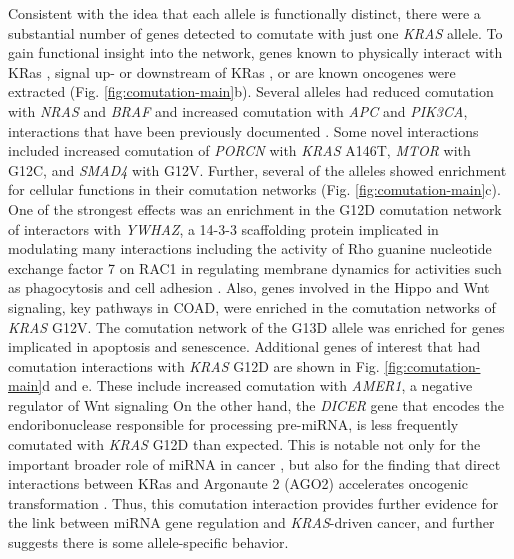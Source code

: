 \documentclass[english, 10pt, letterpaper]{article}
\newcommand{\KRAS}{\emph{KRAS}}
\newcommand{\kras}{KRas}
\begin{document}
Consistent with the idea that each allele is functionally distinct, there were a substantial number of genes detected to comutate with just one \KRAS{} allele.
To gain functional insight into the network, genes known to physically interact with \kras{} \cite{Kovalski2019}, signal up- or downstream of \kras{} \cite{Kanehisa2017, Kanehisa2016KEGGAnnotation.}, or are known oncogenes \cite{Bamford2004TheWebsite., Sondka2018} were extracted (Fig. \ref{fig:comutation-main}b).
Several alleles had reduced comutation with \emph{NRAS} and \emph{BRAF} and increased comutation with \emph{APC} and \emph{PIK3CA}, interactions that have been previously documented \cite{Sensi2006MutuallyMelanoma., Jauhri2017, Seth2009ConcomitantCancer., Cisowski2016, Janssen2006, Sakai2018, Kennedy2011, Wang2013, Green2015, Yeang2008CombinatorialCancer., CancerGenomeAtlasNetwork2012}. 
Some novel interactions included increased comutation of \emph{PORCN} with \KRAS{} A146T, \emph{MTOR} with G12C, and \emph{SMAD4} with G12V.
Further, several of the alleles showed enrichment for cellular functions in their comutation networks (Fig. \ref{fig:comutation-main}c).
One of the strongest effects was an enrichment in the G12D comutation network of interactors with \emph{YWHAZ}, a 14-3-3 scaffolding protein implicated in modulating many interactions including the activity of Rho guanine nucleotide exchange factor 7 on RAC1 in regulating membrane dynamics for activities such as phagocytosis and cell adhesion \cite{Angrand2006TransgenicSignaling.}.
Also, genes involved in the Hippo and Wnt signaling, key pathways in COAD, were enriched in the comutation networks of \KRAS{} G12V.
The comutation network of the G13D allele was enriched for genes implicated in apoptosis and senescence.
Additional genes of interest that had comutation interactions with \KRAS{} G12D are shown in Fig. \ref{fig:comutation-main}d and e.
These include increased comutation with \emph{AMER1}, a negative regulator of Wnt signaling \cite{Grohmann2007AMER1Membrane., Tanneberger2011StructuralAmer1.}
On the other hand, the \emph{DICER} gene that encodes the endoribonuclease responsible for processing pre-miRNA, is less frequently comutated with \KRAS{} G12D than expected.
This is notable not only for the important broader role of miRNA in cancer \cite{Svoronos2016OncomiRCancer., Anastasiadou2018Non-codingCancer.}, but also for the finding that direct interactions between \kras{} and Argonaute 2 (AGO2) accelerates oncogenic transformation \cite{Shankar2016KRASTransformation.}.
Thus, this comutation interaction provides further evidence for the link between miRNA gene regulation and \KRAS{}-driven cancer, and further suggests there is some allele-specific behavior.
\end{document}
